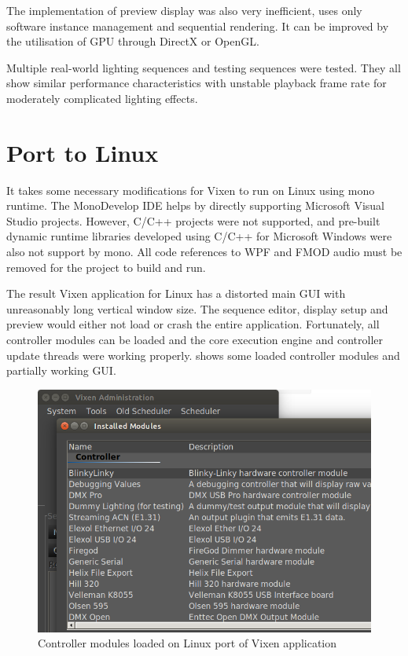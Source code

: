 The implementation of preview display was also very inefficient, uses only software instance management and sequential rendering. It can be improved by the utilisation of GPU through DirectX or OpenGL.

Multiple real-world lighting sequences and testing sequences were tested. They all show similar performance characteristics with unstable playback frame rate for moderately complicated lighting effects.

\section{Port to Linux}

It takes some necessary modifications for Vixen to run on Linux using mono runtime. The MonoDevelop IDE \cite{monodevelop} helps by directly supporting Microsoft Visual Studio projects. However, C/C++ projects were not supported, and pre-built dynamic runtime libraries developed using C/C++ for Microsoft Windows were also not support by mono. All code references to WPF and FMOD audio must be removed for the project to build and run.

The result Vixen application for Linux has a distorted main GUI with unreasonably long vertical window size. The sequence editor, display setup and preview would either not load or crash the entire application. Fortunately, all controller modules can be loaded and the core execution engine and controller update threads were working properly.  shows some loaded controller modules and partially working GUI.

\begin{figure}[t]
  \centering
  \includegraphics[width=0.8\columnwidth]{Figs/vixen_linux_controllers.png}
  \caption{Controller modules loaded on Linux port of Vixen application}
  \label{fig:vixen_linux_main}
\end{figure}

